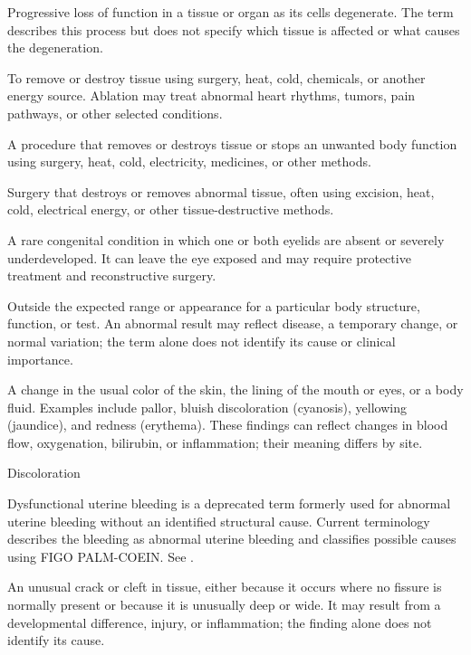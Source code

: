 Progressive loss of function in a tissue or organ as its cells degenerate. The term describes this process but does not specify which tissue is affected or what causes the degeneration.

 To remove or destroy tissue using surgery, heat, cold, chemicals, or another energy source. Ablation may treat abnormal heart rhythms, tumors, pain pathways, or other selected conditions.

 A procedure that removes or destroys tissue or stops an unwanted body function using surgery, heat, cold, electricity, medicines, or other methods.

 Surgery that destroys or removes abnormal tissue, often using excision, heat, cold, electrical energy, or other tissue-destructive methods.

 A rare congenital condition in which one or both eyelids are absent or severely underdeveloped. It can leave the eye exposed and may require protective treatment and reconstructive surgery.

 Outside the expected range or appearance for a particular body structure, function, or test. An abnormal result may reflect disease, a temporary change, or normal variation; the term alone does not identify its cause or clinical importance.

 A change in the usual color of the skin, the lining of the mouth or eyes, or a body fluid. Examples include pallor, bluish discoloration (cyanosis), yellowing (jaundice), and redness (erythema). These findings can reflect changes in blood flow, oxygenation, bilirubin, or inflammation; their meaning differs by site.

\synonyms
Discoloration

 Dysfunctional uterine bleeding is a deprecated term formerly used for abnormal uterine bleeding without an identified structural cause. Current terminology describes the bleeding as abnormal uterine bleeding and classifies possible causes using FIGO PALM-COEIN. See .

 An unusual crack or cleft in tissue, either because it occurs where no fissure is normally present or because it is unusually deep or wide. It may result from a developmental difference, injury, or inflammation; the finding alone does not identify its cause.


